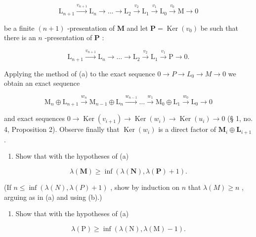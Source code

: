 \[
\mathrm{L} _ {n + 1} \xrightarrow {v _ {n + 1}} \mathrm{L} _ {n} \longrightarrow \dots \longrightarrow \mathrm{L} _ {2} \xrightarrow {v _ {2}} \mathrm{L} _ {1} \xrightarrow {v _ {1}} \mathrm{L} _ {0} \xrightarrow {v _ {0}} \mathrm{M} \longrightarrow 0
\]

be a finite \((n + 1)\) -presentation of \(\mathbf{M}\) and let \(\mathbf{P} = \operatorname{Ker}(v_0)\) be such that there is an \(n\) -presentation of \(\mathbf{P}\) :

\[
\mathrm{L} _ {n + 1} \xrightarrow {v _ {n + 1}} \mathrm{L} _ {n} \longrightarrow \dots \longrightarrow \mathrm{L} _ {2} \xrightarrow {v _ {2}} \mathrm{L} _ {1} \xrightarrow {v _ {1}} \mathrm{P} \longrightarrow 0.
\]

Applying the method of (a) to the exact sequence \(0 \rightarrow P \rightarrow L_{0} \rightarrow M \rightarrow 0\) we obtain an exact sequence

\[
\mathrm{M} _ {n} \oplus \mathrm{L} _ {n + 1} \xrightarrow {w _ {n}} \mathrm{M} _ {n - 1} \oplus \mathrm{L} _ {n} \xrightarrow {w _ {n - 1}} \dots \xrightarrow {w _ {1}} \mathrm{M} _ {0} \oplus \mathrm{L} _ {1} \xrightarrow {w _ {0}} \mathrm{L} _ {0} \longrightarrow 0
\]

and exact sequences \(0 \to \operatorname{Ker}(v_{i+1}) \to \operatorname{Ker}(w_i) \to \operatorname{Ker}(u_i) \to 0\) (§ 1, no. 4, Proposition 2). Observe finally that \(\operatorname{Ker}(w_i)\) is a direct factor of \(\mathbf{M}_i \oplus \mathbf{L}_{i+1}\) .

\begin{enumerate}
\def\labelenumi{(\alph{enumi})}
\setcounter{enumi}{2}
\tightlist
\item
  Show that with the hypotheses of (a)
\end{enumerate}

\[
\lambda (\mathbf {M}) \geqslant \inf (\lambda (\mathbf {N}), \lambda (\mathbf {P}) + 1).
\]

(If \(n \leqslant \inf(\lambda(N), \lambda(P) + 1)\) , show by induction on \(n\) that \(\lambda(M) \geqslant n\) , arguing as in (a) and using (b).)

\begin{enumerate}
\def\labelenumi{(\alph{enumi})}
\setcounter{enumi}{3}
\tightlist
\item
  Show that with the hypotheses of (a)
\end{enumerate}

\[
\lambda (\mathrm{P}) \geqslant \inf (\lambda (\mathrm{N}), \lambda (\mathrm{M}) - 1).
\]


